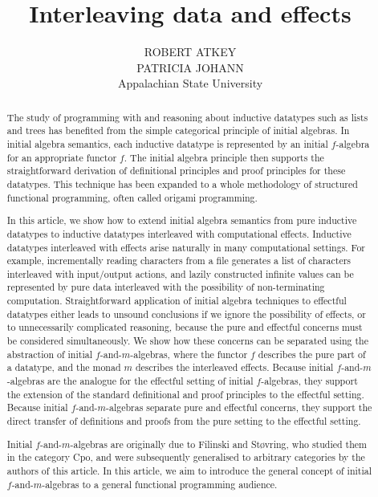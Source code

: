 \documentclass{jfp1}
\title{Interleaving data and effects}
\author[R. Atkey, P. Johann]
       {ROBERT ATKEY \\
         \vspace{0.3em}
         PATRICIA JOHANN \\
         Appalachian State University \\
         \email{bob.atkey@gmail.com, johannp@appstate.edu}}
\begin{document}
\label{firstpage}

\maketitle

\begin{abstract}
  The study of programming with and reasoning about inductive
  datatypes such as lists and trees has benefited from the simple
  categorical principle of initial algebras. In initial algebra
  semantics, each inductive datatype is represented by an initial
  $f$-algebra for an appropriate functor $f$. The initial algebra
  principle then supports the straightforward derivation of
  definitional principles and proof principles for these datatypes.
  This technique has been expanded to a whole methodology of
  structured functional programming, often called origami programming.

  In this article, we show how to extend initial algebra semantics
  from pure inductive datatypes to inductive datatypes interleaved
  with computational effects. Inductive datatypes interleaved with
  effects arise naturally in many computational settings. For example,
  incrementally reading characters from a file generates a list of
  characters interleaved with input/output actions, and lazily
  constructed infinite values can be represented by pure data
  interleaved with the possibility of non-terminating
  computation. Straightforward application of initial algebra
  techniques to effectful datatypes either leads to unsound
  conclusions if we ignore the possibility of effects, or to
  unnecessarily complicated reasoning, because the pure and effectful
  concerns must be considered simultaneously. We show how these
  concerns can be separated using the abstraction of initial
  $f$-and-$m$-algebras, where the functor $f$ describes the pure part
  of a datatype, and the monad $m$ describes the interleaved
  effects. Because initial $f$-and-$m$-algebras are the analogue for
  the effectful setting of initial $f$-algebras, they support the
  extension of the standard definitional and proof principles to the
  effectful setting. Because initial $f$-and-$m$-algebras separate
  pure and effectful concerns, they support the direct transfer of
  definitions and proofs from the pure setting to the effectful
  setting.

  Initial $f$-and-$m$-algebras are originally due to Filinski and
  St\o{}vring, who studied them in the category Cpo, and were
  subsequently generalised to arbitrary categories by the authors of
  this article. In this article, we aim to introduce the general
  concept of initial $f$-and-$m$-algebras to a general functional
  programming audience.
\end{abstract}
\end{document}
